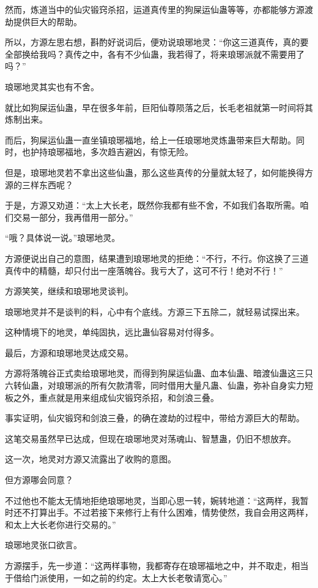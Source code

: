 \begin{this_body}
然而，炼道当中的仙灾锻窍杀招，运道真传里的狗屎运仙蛊等等，亦都能够方源渡劫提供巨大的帮助。

所以，方源左思右想，斟酌好说词后，便劝说琅琊地灵：“你这三道真传，真的要全部换给我吗？真传之中，各有不少仙蛊，我若得了，将来琅琊派就不需要用了吗？”

琅琊地灵其实也有不舍。

就比如狗屎运仙蛊，早在很多年前，巨阳仙尊陨落之后，长毛老祖就第一时间将其炼制出来。

而后，狗屎运仙蛊一直坐镇琅琊福地，给上一任琅琊地灵炼蛊带来巨大帮助。同时，也护持琅琊福地，多次趋吉避凶，有惊无险。

但是，琅琊地灵若不拿出这些仙蛊，那么这些真传的分量就太轻了，如何能换得方源的三样东西呢？

于是，方源又劝道：“太上大长老，既然你我都有些不舍，不如我们各取所需。咱们交易一部分，我再借用一部分。”

“哦？具体说一说。”琅琊地灵。

方源便说出自己的意图，结果遭到琅琊地灵的拒绝：“不行，不行。你这换了三道真传中的精髓，却只付出一座落魄谷。我亏大了，这可不行！绝对不行！”

方源笑笑，继续和琅琊地灵谈判。

琅琊地灵并不是谈判的料，心中有个底线。方源三下五除二，就轻易试探出来。

这种情境下的地灵，单纯固执，远比蛊仙容易对付得多。

最后，方源和琅琊地灵达成交易。

方源将落魄谷正式卖给琅琊地灵，而得到狗屎运仙蛊、血本仙蛊、暗渡仙蛊这三只六转仙蛊，对琅琊派的所有欠款清零，同时借用大量凡蛊、仙蛊，弥补自身实力短板之外，重点就是用来组成仙灾锻窍杀招，和剑浪三叠。

事实证明，仙灾锻窍和剑浪三叠，的确在渡劫的过程中，带给方源巨大的帮助。

这笔交易虽然早已达成，但现在琅琊地灵对荡魂山、智慧蛊，仍旧不想放弃。

这一次，地灵对方源又流露出了收购的意图。

但方源哪会同意？

不过他也不能太无情地拒绝琅琊地灵，当即心思一转，婉转地道：“这两样，我暂时还不打算出手。不过若接下来修行上有什么困难，情势使然，我自会用这两样，和太上大长老你进行交易的。”

琅琊地灵张口欲言。

方源摆手，先一步道：“这两样事物，我都寄存在琅琊福地之中，并不取走，相当于借给门派使用，一如之前的约定。太上大长老敬请宽心。”


\end{this_body}
